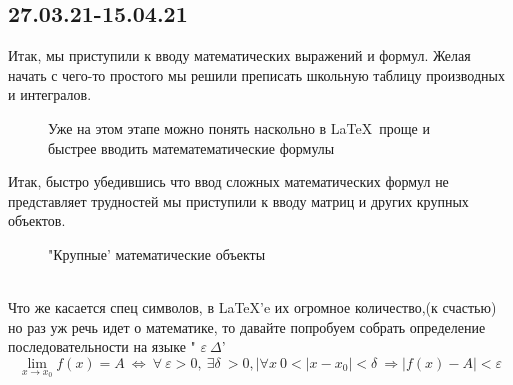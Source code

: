 \documentclass[14pt, a4paper]{extarticle}
\begin{document}
\subsection{27.03.21-15.04.21}
Итак, мы приступили к вводу математических выражений и формул. Желая начать с чего-то простого мы решили преписать школьную таблицу производных и интегралов.
\begin{figure}[h!]
\setlength{\fboxsep}{0pt}%
\setlength{\fboxrule}{1pt}%
%
\caption{Уже на этом этапе можно понять наскольно в \LaTeX \  проще и быстрее вводить математематические формулы}
\label{fig:image}
\end{figure}
\newpage
Итак, быстро убедившись что ввод сложных математических формул не представляет трудностей мы приступили к вводу матриц и других крупных объектов.
\begin{figure}[h!]
\setlength{\fboxsep}{0pt}%
\setlength{\fboxrule}{1pt}%
%
\caption{"Крупные' математические объекты}
\end{figure}
\\
Что же касается спец символов, в \LaTeX 'e их огромное количество,(к счастью) но раз уж речь идет о математике, то давайте попробуем собрать определение последовательности на языке " $\varepsilon \ \Delta $'
$$\lim_{x \rightarrow x_0}f(x) = A \  \Leftrightarrow \   \forall \ \varepsilon > 0, \ \exists \delta \ >0, |\forall x \ 0<|x-x_0|<\delta \ \Rightarrow |f(x) - A|< \varepsilon   $$
\end{document}
